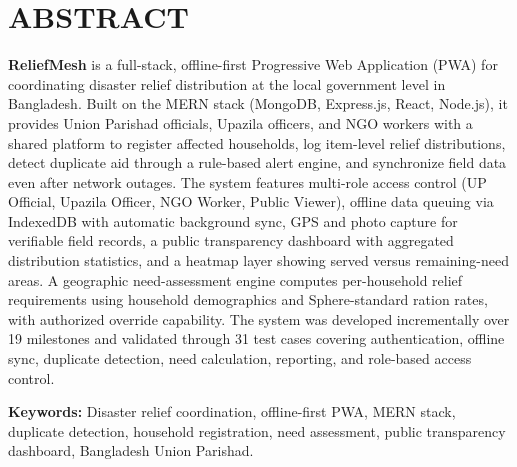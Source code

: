 \chapter*{ABSTRACT}

\textbf{ReliefMesh} is a full-stack, offline-first Progressive Web Application (PWA) for coordinating disaster relief distribution at the local government level in Bangladesh. Built on the MERN stack (MongoDB, Express.js, React, Node.js), it provides Union Parishad officials, Upazila officers, and NGO workers with a shared platform to register affected households, log item-level relief distributions, detect duplicate aid through a rule-based alert engine, and synchronize field data even after network outages. The system features multi-role access control (UP Official, Upazila Officer, NGO Worker, Public Viewer), offline data queuing via IndexedDB with automatic background sync, GPS and photo capture for verifiable field records, a public transparency dashboard with aggregated distribution statistics, and a heatmap layer showing served versus remaining-need areas. A geographic need-assessment engine computes per-household relief requirements using household demographics and Sphere-standard ration rates, with authorized override capability. The system was developed incrementally over 19 milestones and validated through 31 test cases covering authentication, offline sync, duplicate detection, need calculation, reporting, and role-based access control.

\textbf{Keywords:} Disaster relief coordination, offline-first PWA, MERN stack, duplicate detection, household registration, need assessment, public transparency dashboard, Bangladesh Union Parishad.
